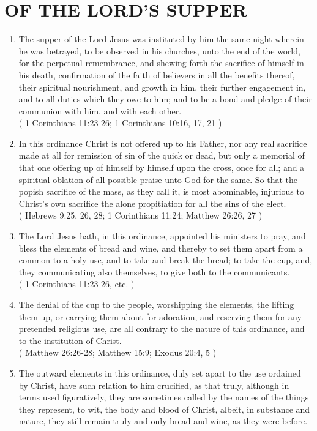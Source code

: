 \documentclass[12pt,a4paper]{book}
\begin{document}
\chapter{OF THE LORD'S SUPPER}
\label{ch-lor-sup}
\begin{enumerate}
\item The supper of the Lord Jesus was instituted by him the same night wherein he was betrayed, to be observed in his churches, unto the end of the world, for the perpetual remembrance, and shewing forth the sacrifice of himself in his death, confirmation of the faith of believers in all the benefits thereof, their spiritual nourishment, and growth in him, their further engagement in, and to all duties which they owe to him; and to be a bond and pledge of their communion with him, and with each other.\\
( 1 Corinthians 11:23-26; 1 Corinthians 10:16, 17, 21 )
\item In this ordinance Christ is not offered up to his Father, nor any real sacrifice made at all for remission of sin of the quick or dead, but only a memorial of that one offering up of himself by himself upon the cross, once for all; and a spiritual oblation of all possible praise unto God for the same. So that the popish sacrifice of the mass, as they call it, is most abominable, injurious to Christ's own sacrifice the alone propitiation for all the sins of the elect.\\
( Hebrews 9:25, 26, 28; 1 Corinthians 11:24; Matthew 26:26, 27 )
\item The Lord Jesus hath, in this ordinance, appointed his ministers to pray, and bless the elements of bread and wine, and thereby to set them apart from a common to a holy use, and to take and break the bread; to take the cup, and, they communicating also themselves, to give both to the communicants.\\
( 1 Corinthians 11:23-26, etc. )
\item The denial of the cup to the people, worshipping the elements, the lifting them up, or carrying them about for adoration, and reserving them for any pretended religious use, are all contrary to the nature of this ordinance, and to the institution of Christ.\\
( Matthew 26:26-28; Matthew 15:9; Exodus 20:4, 5 )
\item The outward elements in this ordinance, duly set apart to the use ordained by Christ, have such relation to him crucified, as that truly, although in terms used figuratively, they are sometimes called by the names of the things they represent, to wit, the body and blood of Christ, albeit, in substance and nature, they still remain truly and only bread and wine, as they were before.\\

\end{enumerate}
\end{document}

